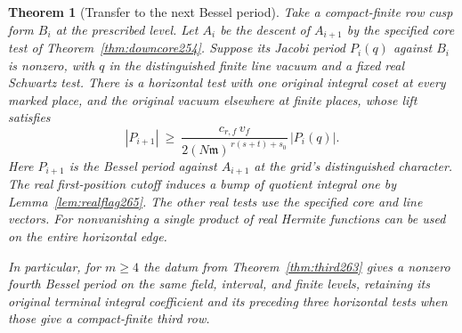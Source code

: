 \documentclass[a4paper,11pt]{article}
\newtheorem{theorem}[proposition]{Theorem}
\theoremstyle{definition}
\theoremstyle{remark}
\numberwithin{equation}{section}
\begin{document}
\begin{theorem}[Transfer to the next Bessel period]\leavevmode
\label{thm:bestransfer265}
Take a compact-finite row cusp form \(B_i\) at the prescribed
level. Let \(A_i\) be the descent of \(A_{i+1}\) by the
specified core test of Theorem~\ref{thm:downcore254}. Suppose its
Jacobi period \(P_i(q)\) against \(B_i\) is nonzero, with \(q\)
in the distinguished finite line vacuum and a fixed real
Schwartz test. There is a horizontal test with one original
integral coset at every marked place, and the original vacuum
elsewhere at finite places, whose lift satisfies
\[
 |P_{i+1}|\ \ge\
   \frac{c_{r,f}\,v_f}{2(N\mathfrak m)^{\,r(s+t)+s_0}}\,
   |P_i(q)|.
\]
Here \(P_{i+1}\) is the Bessel period against \(A_{i+1}\) at
the grid's distinguished character. The real first-position
cutoff induces a bump of quotient integral one by
Lemma~\ref{lem:realflag265}. The other real tests use the
specified core and line vectors. For nonvanishing a single
product of real Hermite functions can be used on the entire
horizontal edge.

In particular, for \(m\ge4\) the datum from
Theorem~\ref{thm:third263} gives a nonzero fourth Bessel
period on the same field, interval, and finite levels,
retaining its original terminal integral coefficient and its
preceding three horizontal tests when those give a compact-finite
third row.
\end{theorem}
\end{document}
